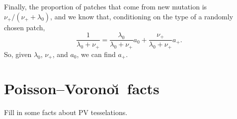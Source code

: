 \documentclass{article}
\begin{document}
Finally, the proportion of patches that come from new mutation is $\nu_+ / (\nu_+ + \lambda_0)$,
and we know that, conditioning on the type of a randomly chosen patch,
\[
    \frac{1}{\lambda_0+\nu_+} = \frac{\lambda_0}{\lambda_0+\nu_+} a_0 + \frac{\nu_+}{\lambda_0+\nu_+} a_+ .
\]
So, given $\lambda_0$, $\nu_+$, and $a_0$, we can find $a_+$.


\section{Poisson--Vorono\u\i\ facts}

Fill in some facts about PV tesselations.
\end{document}
